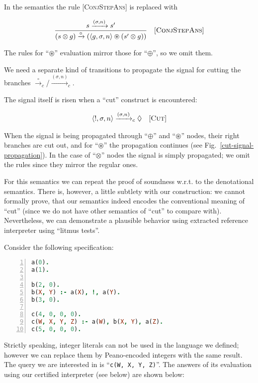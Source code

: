 In the semantics the rule \textsc{[ConjStepAns]} is replaced with

\[
\begin{array}{cr}
  \dfrac{s \xrightarrow{(\sigma, n)} s'}{(s \otimes g) \xrightarrow{\circ} (\left<{g, \sigma, n}\right> \circledast (s' \otimes g))} & \mbox{[\textsc{ConjStepAns}]} 
\end{array}
\]

The rules for ``$\circledast$'' evaluation mirror those for ``$\oplus$'', so we omit them.

We need a separate kind of transitions to propagate the signal for cutting the branches $\xrightarrow{\circ}_c$/$\xrightarrow{(\sigma, n)}_c$.

The signal itself is risen when a ``cut'' construct is encountered:

\[
\begin{array}{cr}
  \left<{!, \sigma, n}\right> \xrightarrow{(\sigma, n)}_c \Diamond &\mbox{[\textsc{Cut}]} 
\end{array}
\]

When the signal is being propagated through ``$\oplus$'' and ``$\circledast$'' nodes, their right branches are cut out, and for ``$\circledast$'' the
propagation continues (see Fig.~\ref{cut-signal-propagation}). In the case of ``$\otimes$'' nodes the signal is simply propagated; we omit the rules since they mirror the regular ones.

For this semantics we can repeat the proof of soundness w.r.t. to the denotational semantics. There is, however, a little subtlety with our construction:
we cannot formally prove, that our semantics indeed encodes the conventional meaning of ``cut'' (since we do not have other semantics of ``cut'' to compare with).
Nevertheless, we can demonstrate a plausible behavior using extracted reference interpreter using ``litmus tests''.

Consider the following specification:


\begin{lstlisting}[language=Prolog,numbers=left,stepnumber=1]
a(0).
a(1).

b(2, 0).
b(X, Y) :- a(X), !, a(Y).
b(3, 0).

c(4, 0, 0, 0).
c(W, X, Y, Z) :- a(W), b(X, Y), a(Z).
c(5, 0, 0, 0).
\end{lstlisting}

Strictly speaking, integer literals can not be used in the language we defined; however we can replace them by Peano-encoded
integers with the same result. The query we are interested in is ``\lstinline|c(W, X, Y, Z)|''. The answers of its
evaluation using our certified interpreter (see below) are shown below:

